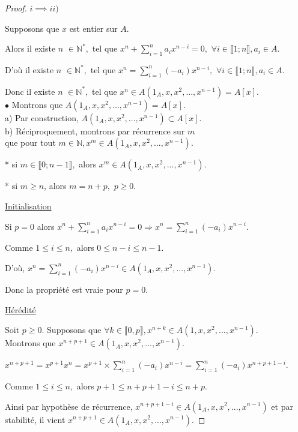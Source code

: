 \begin{proof}
	$i \implies ii)$
	
	Supposons que $x$ est entier sur $A.$
	
	Alors il existe $n$ $\in \mathbb{N}^{\ast },$ tel que $x^{n}+\sum\limits_{i=1}^{n}a_{i}x^{n-i}=0,$ $\forall i\in \llbracket 1; n \rrbracket ,a_{i}\in A.$
	
	D'où il existe $n$ $\in \mathbb{N}^{\ast },$ tel que $x^{n}=\sum\limits_{i=1}^{n}(-a_{i})x^{n-i},$ $\forall i\in \llbracket 1; n \rrbracket ,a_{i}\in A.$
	
	Donc il existe $n$ $\in \mathbb{N}^{\ast },$ tel que $x^{n}\in A(1_A,x,x^{2},...,x^{n-1})=A[x].$\\
	$\bullet$ Montrons que $A(1_A,x,x^{2},...,x^{n-1})=A[x].$\\
	a) Par construction, $A(1_A,x,x^{2},...,x^{n-1})\subset A[x].$\\
	b) Réciproquement, montrons par récurrence sur $m$\\ que pour tout $m	\in \mathbb{N},x^{m}\in A(1_A,x,x^{2},...,x^{n-1}).$
	
	* si $m\in \llbracket 0; n-1 \rrbracket ,$ alors $x^{m}\in A(1_A,x,x^{2},...,x^{n-1}).$
	
	* si $m\geq n$, alors $m=n+p,$ $p\geq 0.$
	
	\underline{Initialisation}
	
	Si $p=0$ alors  $x^{n}+\sum\limits_{i=1}^{n}a_{i}x^{n-i}=0\Rightarrow
	x^{n}=\sum\limits_{i=1}^{n}(-a_{i})x^{n-i}.$
	
	Comme $1\leq i\leq n,$ alors $0\leq n-i\leq n-1$.
	
	D'où, $x^{n}=\sum\limits_{i=1}^{n}(-a_{i})x^{n-i}\in
	A(1_A,x,x^{2},...,x^{n-1}).$
	
	Donc la propriété est vraie pour $p=0$.
	
	\underline{Hérédité}
	
	Soit $p\geq 0.$ Supposons que $\forall k\in \llbracket 0, p \rrbracket
	,x^{n+k}\in A(1,x,x^{2},...,x^{n-1})$.\\ Montrons que $x^{n+p+1}\in
	A(1_A,x,x^{2},...,x^{n-1}).$
	
	$x^{n+p+1}=x^{p+1}x^{n}=x^{p+1}\times
	\sum\limits_{i=1}^{n}(-a_{i})x^{n-i}=\sum\limits_{i=1}^{n}(-a_{i})x^{n+p+1-i}$.
	
	Comme $1\leq i\leq n,$ alors $p+1\leq n+p+1-i\leq n+p$.
	
	Ainsi par hypothèse de récurrence, $x^{n+p+1-i}\in
	A(1_A,x,x^{2},...,x^{n-1})$ et par stabilité, il vient $x^{n+p+1}\in
	A(1_A,x,x^{2},...,x^{n-1}).$
	

\end{proof}
